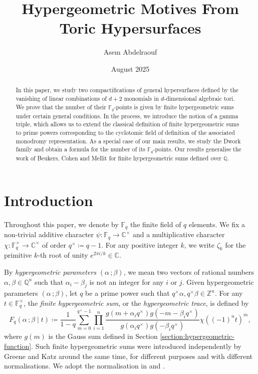 \documentclass[11pt, reqno]{amsart}
\title{Hypergeometric Motives From Toric Hypersurfaces}
\author{Asem Abdelraouf}
\date{August 2025}
\theoremstyle{plain}
\theoremstyle{definition}
\newcommand{\Z}{\mathbb{Z}}
\newcommand{\Q}{\mathbb{Q}}
\newcommand{\F}{\mathbb{F}}
\newcommand{\C}{\mathbb{C}}
\newcommand{\be}{\beta}
\newcommand{\al}{\alpha}
\begin{document}
\begin{abstract}
In this paper, we study two compactifications of general hypersurfaces defined by the vanishing of linear combinations of $d+2$ monomials in $d$-dimensional algebraic tori. 
We prove that the number of their $\F_q$-points is given by finite hypergeometric sums under certain general conditions. 
In the process, we introduce the notion of a gamma triple, which allows us to extend the classical definition of finite hypergeometric sums to prime powers corresponding to the cyclotomic field of definition of the associated monodromy representation. 
As a special case of our main results, we study the Dwork family and obtain a formula for the number of its $\F_q$-points. 
Our results generalise the work of Beukers, Cohen and Mellit for finite hypergeometric sums defined over $\Q$.
\end{abstract}
\maketitle
\section{Introduction}
Throughout this paper, we denote by $\F_q$ the finite field of $q$ elements.
We fix a non-trivial additive character $\psi: \F_q \to \C^\times$ and a multiplicative character $\chi: \F_q^\times \to \C^\times$ of order $q^\times \coloneqq q-1$. For any positive integer $k$, we write $\zeta_k$ for the primitive $k$-th root of unity $ e^{2\pi i/k} \in \C$. \hfill

By \emph{hypergeometric parameters} $(\al \, ; \be)$, we mean two vectors of rational numbers  $\al, \be \in \Q^{n}$ such that $\al_i-\be_j$ is not an integer for any $i$ or $j$.
Given hypergeometric parameters $(\al \, ; \be)$, let $q$ be a prime power such that  $q^\times \al,q^\times \be \in \Z^{n}$.  
For any $t \in \F_q^\times$, the \emph{finite hypergeometric sum}, or the \emph{hypergeometric trace}, is defined by
\begin{equation}\label{eq:intro-defi-hg}
F_q\left(\al \, ; \be \mid t\right) \coloneqq \frac{1}{1-q} \sum_{m=0}^{q^\times-1} \prod_{i=1}^n \frac{g(m+\alpha_iq^\times)g(-m-\beta_iq^\times)}{g(\alpha_iq^\times)g(-\beta_i q^\times)} \chi((-1)^nt)^m ,   
\end{equation}
where $g(m)$ is the Gauss sum defined in Section \ref{section:hypergeometric-function}. 
Such finite hypergeometric sums were introduced independently by Greene \cite{Greene-hypergeometric} and Katz \cite{Katz-expo-sums} around the same time, for different purposes and with different normalisations. We adopt the normalisation in
\cite[Definition 1.1]{BCM} and \cite[Equation 10.1]{hypergeometric-survey}.
\end{document}

